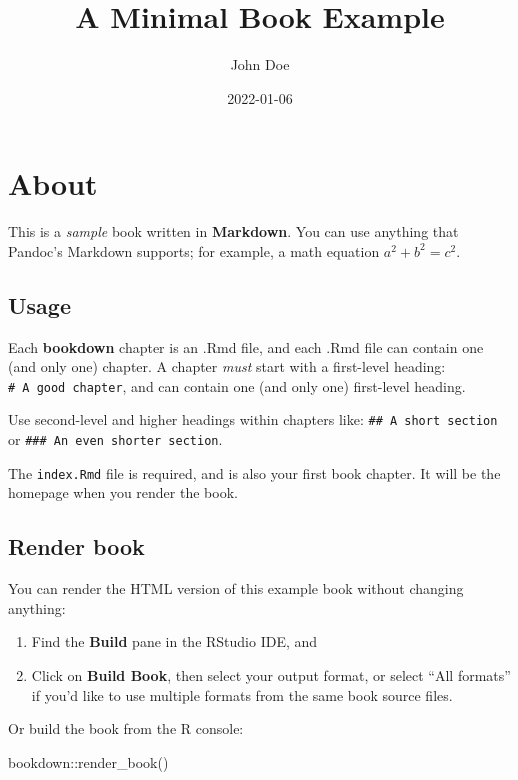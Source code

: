 \documentclass[
]{book}
\title{A Minimal Book Example}
\author{John Doe}
\date{2022-01-06}
\newenvironment{Shaded}{\begin{snugshade}}{\end{snugshade}}
\newcommand{\FunctionTok}[1]{\textcolor[rgb]{0.00,0.00,0.00}{#1}}
\newcommand{\NormalTok}[1]{#1}
\newcommand{\SpecialCharTok}[1]{\textcolor[rgb]{0.00,0.00,0.00}{#1}}
\begin{document}
\maketitle

{
\setcounter{tocdepth}{1}
\tableofcontents
}
\hypertarget{about}{%
\chapter{About}\label{about}}

This is a \emph{sample} book written in \textbf{Markdown}. You can use anything that Pandoc's Markdown supports; for example, a math equation \(a^2 + b^2 = c^2\).

\hypertarget{usage}{%
\section{Usage}\label{usage}}

Each \textbf{bookdown} chapter is an .Rmd file, and each .Rmd file can contain one (and only one) chapter. A chapter \emph{must} start with a first-level heading: \texttt{\#\ A\ good\ chapter}, and can contain one (and only one) first-level heading.

Use second-level and higher headings within chapters like: \texttt{\#\#\ A\ short\ section} or \texttt{\#\#\#\ An\ even\ shorter\ section}.

The \texttt{index.Rmd} file is required, and is also your first book chapter. It will be the homepage when you render the book.

\hypertarget{render-book}{%
\section{Render book}\label{render-book}}

You can render the HTML version of this example book without changing anything:

\begin{enumerate}
\def\labelenumi{\arabic{enumi}.}
\item
  Find the \textbf{Build} pane in the RStudio IDE, and
\item
  Click on \textbf{Build Book}, then select your output format, or select ``All formats'' if you'd like to use multiple formats from the same book source files.
\end{enumerate}

Or build the book from the R console:

\begin{Shaded}
\begin{Highlighting}[]
\NormalTok{bookdown}\SpecialCharTok{::}\FunctionTok{render\_book}\NormalTok{()}
\end{Highlighting}
\end{Shaded}
\end{document}
